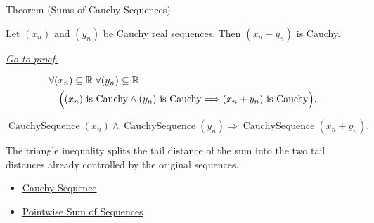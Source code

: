 
\begin{theorembox}{Theorem (Sums of Cauchy Sequences)}
\begin{theorem}
\label{thm:sum-cauchy-sequences}
Let $(x_n)$ and $(y_n)$ be Cauchy real sequences. Then $(x_n+y_n)$ is
Cauchy.

\smallskip
\noindent
\hyperref[prf:sum-cauchy-sequences]{\textit{Go to proof.}}
\end{theorem}
\end{theorembox}

\begin{remark*}
\[
\begin{aligned}
&\forall (x_n)\subseteq\mathbb{R}\;\forall (y_n)\subseteq\mathbb{R}\\
&\quad
\Bigl(
  (x_n)\text{ is Cauchy}
  \land
  (y_n)\text{ is Cauchy}
  \Longrightarrow
  (x_n+y_n)\text{ is Cauchy}
\Bigr).
\end{aligned}
\]
\end{remark*}

\begin{remark*}
\[
\operatorname{CauchySequence}(x_n)
\land
\operatorname{CauchySequence}(y_n)
\Longrightarrow
\operatorname{CauchySequence}(x_n+y_n).
\]
\end{remark*}

\begin{remark*}[Interpretation]
The triangle inequality splits the tail distance of the sum into the two tail
distances already controlled by the original sequences.
\end{remark*}

\begin{dependencies}
\begin{itemize}
  \item \hyperref[def:cauchy-sequence]{Cauchy Sequence}
  \item \hyperref[def:pointwise-sum-sequence]{Pointwise Sum of Sequences}
\end{itemize}
\end{dependencies}


